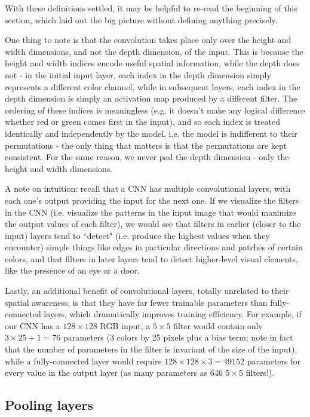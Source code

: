 With these definitions settled, it may be helpful to re-read the beginning of this section, which laid out the big picture without defining anything precisely.

One thing to note is that the convolution takes place only over the height and width dimensions, and not the depth dimension, of the input. This is because the height and width indices encode useful spatial information, while the depth does not - in the initial input layer, each index in the depth dimension simply represents a different color channel, while in subsequent layers, each index in the depth dimension is simply an activation map produced by a different filter. The ordering of these indices is meaningless (e.g. it doesn't make any logical difference whether red or green comes first in the input), and so each index is treated identically and independently by the model, i.e. the model is indifferent to their permutations - the only thing that matters is that the permutations are kept consistent. For the same reason, we never pad the depth dimension - only the height and width dimensions.

A note on intuition: recall that a CNN has multiple convolutional layers, with each one's output providing the input for the next one. If we visualize the filters in the CNN (i.e. visualize the patterns in the input image that would maximize the output values of each filter), we would see that filters in earlier (closer to the input) layers tend to ``detect" (i.e. produce the highest values when they encounter) simple things like edges in particular directions and patches of certain colors, and that filters in later layers tend to detect higher-level visual elements, like the presence of an eye or a door.

Lastly, an additional benefit of convolutional layers, totally unrelated to their spatial awareness, is that they have far fewer trainable parameters than fully-connected layers, which dramatically improves training efficiency. For example, if our CNN has a $128 \times 128$ RGB input, a $5 \times 5$ filter would contain only $3 \times 25 + 1 = 76$ parameters (3 colors by 25 pixels plus a bias term; note in fact that the number of parameters in the filter is invariant of the size of the input), while a fully-connected layer would require $128 \times 128 \times 3 = 49152$ parameters for every value in the output layer (as many parameters as 646 $5 \times 5$ filters!).

\subsection{Pooling layers}

